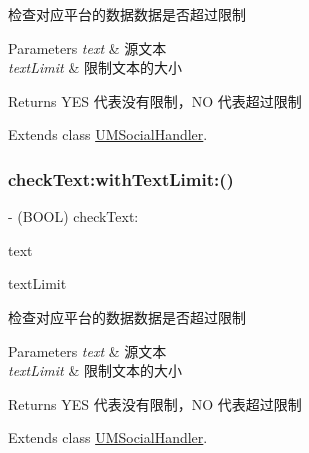 检查对应平台的数据数据是否超过限制


\begin{DoxyParams}{Parameters}
{\em text} & 源文本 \\
\hline
{\em text\+Limit} & 限制文本的大小\\
\hline
\end{DoxyParams}
\begin{DoxyReturn}{Returns}
Y\+ES 代表没有限制，\+NO 代表超过限制 
\end{DoxyReturn}


Extends class \mbox{\hyperlink{interface_u_m_social_handler_a50a70e47f3feb853f947b55aebf3dde2}{U\+M\+Social\+Handler}}.

\mbox{\label{category_u_m_social_handler_07_u_m_social_limit_08_a50a70e47f3feb853f947b55aebf3dde2}} 
\subsubsection{\texorpdfstring{check\+Text\+:with\+Text\+Limit\+:()}{checkText:withTextLimit:()}\hspace{0.1cm}{\footnotesize\ttfamily [2/2]}}
{\footnotesize\ttfamily -\/ (B\+O\+OL) check\+Text\+: \begin{DoxyParamCaption}\item[{(N\+S\+String $\ast$)}]{text }\item[{withTextLimit:(N\+S\+U\+Integer)}]{text\+Limit }\end{DoxyParamCaption}}

检查对应平台的数据数据是否超过限制


\begin{DoxyParams}{Parameters}
{\em text} & 源文本 \\
\hline
{\em text\+Limit} & 限制文本的大小\\
\hline
\end{DoxyParams}
\begin{DoxyReturn}{Returns}
Y\+ES 代表没有限制，\+NO 代表超过限制 
\end{DoxyReturn}


Extends class \mbox{\hyperlink{interface_u_m_social_handler_a50a70e47f3feb853f947b55aebf3dde2}{U\+M\+Social\+Handler}}.

